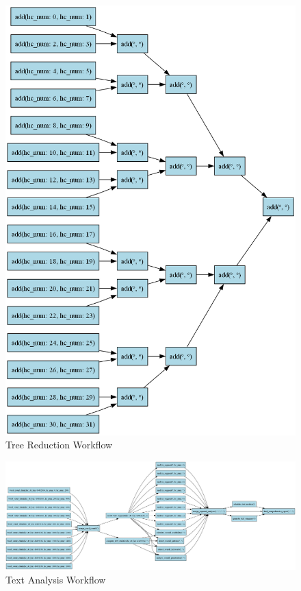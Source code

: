 \documentclass[conference]{IEEEtran}
\begin{document}
\begin{figure}[H]
    \centering
    \includegraphics[width=\columnwidth]{figures/dag_image_tree_reduction.png}
    \caption{Tree Reduction Workflow}
    \label{fig:tree_reduction}
\end{figure}
\begin{figure}[H]
    \centering
    \includegraphics[width=\columnwidth]{figures/dag_image_text_analysis.png}
    \caption{Text Analysis Workflow}
    \label{fig:text_analysis}
\end{figure}
\end{document}
